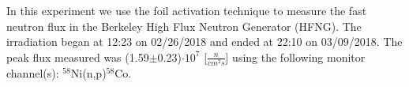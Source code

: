 In this experiment we use the foil activation technique to measure the fast neutron flux in the Berkeley High Flux Neutron Generator (HFNG).  The irradiation began at 12:23 on 02/26/2018 and ended at 22:10 on 03/09/2018.  The peak flux measured was (1.59$\pm$0.23)$\cdot 10^7$ [$\frac{n}{cm^2s}$] using the following monitor channel(s): $^{58}$Ni(n,p)$^{58}$Co.